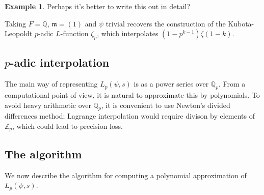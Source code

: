 \documentclass[11pt,a4paper]{article}
\let\mf\mathfrak
\newcommand{\Z}{\mathbb{Z}}
\newcommand{\Q}{\mathbb{Q}}
\theoremstyle{plain}
\theoremstyle{definition}
\newtheorem{eg}[thm]{Example}
\theoremstyle{remark}
\numberwithin{equation}{section}
\begin{document}
\begin{eg}
{\color{red}Perhaps it's better to write this out in detail?  }

Taking $F = \Q$, $\mf m = (1)$ and $\psi$ trivial recovers the
construction of the Kubota-Leopoldt $p$-adic $L$-function $\zeta_{p}$,
which interpolates $(1-p^{k-1})\zeta(1-k)$. 
\end{eg}
\subsection{$p$-adic interpolation}
\label{sec:p-adic-interpolation}
The main way of representing $L_{p}(\psi,s)$  is as a power series over
$\Q_{p}$. From a computational point of view, it is natural to
approximate this by polynomials. To avoid heavy arithmetic over
$\Q_{p}$, it is convenient to use Newton's divided differences
method; Lagrange interpolation would require divison by elements of
$\Z_{p}$, which could lead to precision loss.



\subsection{The algorithm}
\label{sec:algorithm}
We now describe the algorithm for computing a polynomial approximation
of $L_{p}(\psi,s)$. 
\end{document}
